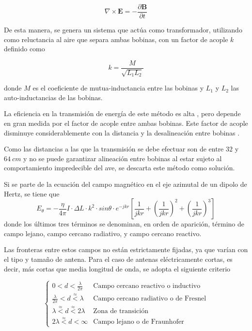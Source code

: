 \begin{equation}
\nabla \times \mathbf{E} = -\frac{\partial \mathbf{B}}{\partial t}
\end{equation}

De esta manera, se genera un sistema que actúa como transformador, utilizando como reluctancia al aire que separa ambas bobinas, con un factor de acople $k$ definido como

\begin{equation}
k = \frac{M}{\sqrt{L_1L_2}}
\end{equation}

donde $M$ es el coeficiente de mutua-inductancia entre las bobinas y $L_1$ y $L_2$ las auto-inductancias de las bobinas. 

La eficiencia en la transmisión de energía de este método es alta \cite{ref:wpteff}, pero depende en gran medida por el factor de acople entre ambas bobinas. Este factor de acople disminuye considerablemente con la distancia y la desalineación entre bobinas \cite{ref:wirelesschargingkeyelements} \cite{ref:couplingfactor_1}.

Como las distancias a las que la transmisión se debe efectuar son de entre $32$ y $64 \ cm$ y no se puede garantizar alineación entre bobinas al estar sujeto al comportamiento impredecible del ave, se descarta este método como solución.


Si se parte de la ecuación del campo magnético en el eje azimutal de un dipolo de Hertz, se tiene que
\begin{equation}
E_\theta = -\frac{\eta}{4\pi}I \cdot \Delta L \cdot k^2 \cdot sin\theta \cdot e^{-jkr} \left[ \frac{1}{jkr}+\left( \frac{1}{jkr}\right)^2 + \left(\frac{1}{jkr}\right)^3 \right]
\end{equation}
donde los últimos tres términos se denominan, en orden de aparición, término de campo lejano, campo cercano radiativo, y campo cercano reactivo. 

Las fronteras entre estos campos no están estrictamente fijadas, ya que varían con el tipo y tamaño de antena. Para el caso de antenas eléctricamente cortas, es decir, más cortas que media longitud de onda, se adopta el siguiente criterio

\begin{equation}
\begin{cases} 
          0 < d <\frac{\lambda}{2\pi} & \text{Campo cercano reactivo o inductivo} \\
          \frac{\lambda}{2\pi} < d \overset{\approx}{<} \lambda & \text{Campo cercano radiativo o de Fresnel} \\
          \lambda \overset{\approx}{<} d \overset{\approx}{<} 2\lambda & \text{Zona de transición} \\
          2\lambda \overset{\approx}{<} d < \infty  & \text{Campo lejano o de Fraunhofer} 
       \end{cases}
\end{equation}

